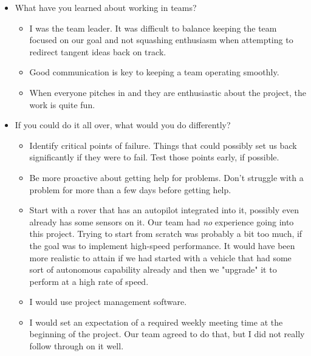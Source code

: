 \documentclass[compsoc,draftclsnofoot,onecolumn,10pt]{IEEEtran}
\begin{document}
\begin{itemize}
    \item What have you learned about working in teams?
        \begin{itemize}
        \item I was the team leader. It was difficult to balance keeping the team focused on our goal and not squashing enthusiasm when attempting to redirect tangent ideas back on track.
        \item Good communication is key to keeping a team operating smoothly.
        \item When everyone pitches in and they are enthusiastic about the project, the work is quite fun.
    \end{itemize}

    \item If you could do it all over, what would you do differently?
    \begin{itemize}
        \item Identify critical points of failure. Things that could possibly set us back significantly if they were to fail.
        \subitem Test those points early, if possible.
        \item Be more proactive about getting help for problems. Don't struggle with a problem for more than a few days before getting help.
        \item Start with a rover that has an autopilot integrated into it, possibly even already has some sensors on it.
        \subitem Our team had \textit{no} experience going into this project. Trying to start from scratch was probably a bit too much, if the goal was to implement high-speed performance. It would have been more realistic to attain if we had started with a vehicle that had some sort of autonomous capability already and then we "upgrade" it to perform at a high rate of speed.
        \item I would use project management software.
        \item I would set an expectation of a required weekly meeting time at the beginning of the project. Our team agreed to do that, but I did not really follow through on it well.
    \end{itemize}
\end{itemize}
\end{document}
